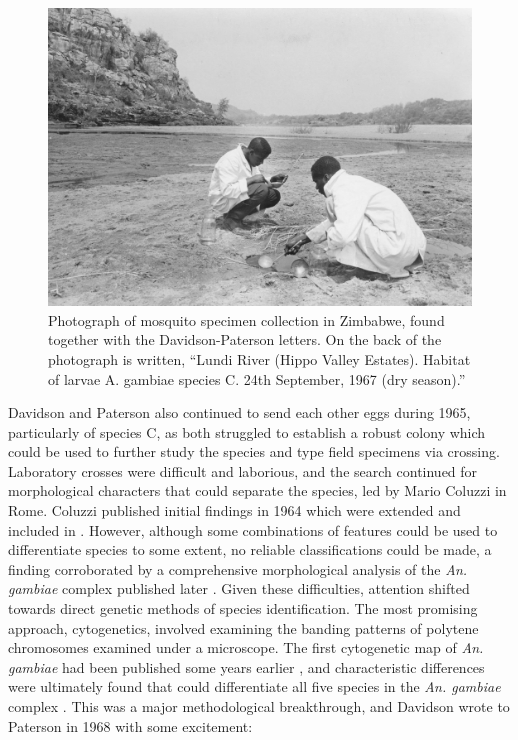 \documentclass[a4paper,11pt,abstracton,hidelinks]{scrartcl}
\begin{document}
\begin{figure}[t]
\centering
\includegraphics[width=\textwidth]{davidson-letters/Photo-Zimbabwe-Lundi.pdf}
\caption{Photograph of mosquito specimen collection in Zimbabwe, found together with the Davidson-Paterson letters. On the back of the photograph is written, ``Lundi River (Hippo Valley Estates). Habitat of larvae A. gambiae species C. 24th September, 1967 (dry season).''}
\end{figure}


Davidson and Paterson also continued to send each other eggs during 1965, particularly of species C, as both struggled to establish a robust colony which could be used to further study the species and type field specimens via crossing. 
Laboratory crosses were difficult and laborious, and the search continued for morphological characters that could separate the species, led by Mario Coluzzi in Rome. 
Coluzzi published initial findings in 1964 \citep{Coluzzi1964} which were extended and included in \citet{Davidson1967}. 
However, although some combinations of features could be used to differentiate species to some extent, no reliable classifications could be made, a finding corroborated by a comprehensive morphological analysis of the \textit{An. gambiae} complex published later \citep{Coetzee1989}. 
Given these difficulties, attention shifted towards direct genetic methods of species identification. 
The most promising approach, cytogenetics, involved examining the banding patterns of polytene chromosomes examined under a microscope. 
The first cytogenetic map of \textit{An. gambiae} had been published some years earlier \citep{Frizzi1956}, and characteristic differences were ultimately found that could differentiate all five species in the \textit{An. gambiae} complex \citep{Coluzzi1967,Coluzzi1968,Coluzzi1969}.
This was a major methodological breakthrough, and Davidson wrote to Paterson in 1968 with some excitement:
\end{document}
